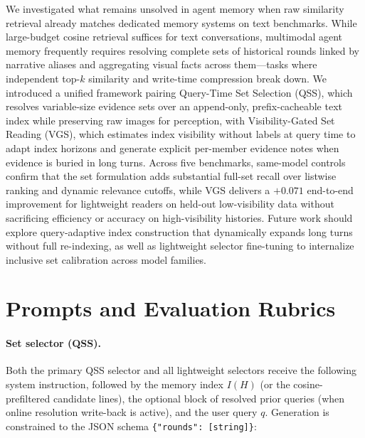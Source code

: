 \documentclass[10pt]{article}
\newcommand{\qss}{QSS}
\begin{document}
We investigated what remains unsolved in agent memory when raw similarity retrieval already matches dedicated memory systems on text benchmarks. While large-budget cosine retrieval suffices for text conversations, multimodal agent memory frequently requires resolving complete sets of historical rounds linked by narrative aliases and aggregating visual facts across them—tasks where independent top-$k$ similarity and write-time compression break down. We introduced a unified framework pairing Query-Time Set Selection (\qss{}), which resolves variable-size evidence sets over an append-only, prefix-cacheable text index while preserving raw images for perception, with Visibility-Gated Set Reading (VGS), which estimates index visibility without labels at query time to adapt index horizons and generate explicit per-member evidence notes when evidence is buried in long turns. Across five benchmarks, same-model controls confirm that the set formulation adds substantial full-set recall over listwise ranking and dynamic relevance cutoffs, while VGS delivers a $+0.071$ end-to-end improvement for lightweight readers on held-out low-visibility data without sacrificing efficiency or accuracy on high-visibility histories. Future work should explore query-adaptive index construction that dynamically expands long turns without full re-indexing, as well as lightweight selector fine-tuning to internalize inclusive set calibration across model families.




\appendix

\section{Prompts and Evaluation Rubrics}
\label{app:prompts}

\paragraph{Set selector (\qss{}).} Both the primary \qss{} selector and all lightweight selectors receive the following system instruction, followed by the memory index $I(H)$ (or the cosine-prefiltered candidate lines), the optional block of resolved prior queries (when online resolution write-back is active), and the user query $q$. Generation is constrained to the JSON schema \texttt{\{"rounds": [string]\}}:
\end{document}
